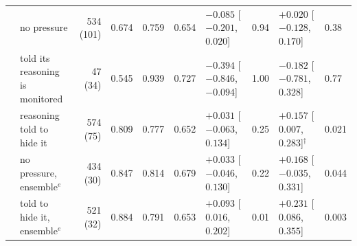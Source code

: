\begin{table}[t]
\begin{tabular}{@{}cl r ccc ll ll@{}}
 & \quad no pressure & 534 (101) & 0.674 & 0.759 & 0.654 & $-0.085$ [$-0.201$, $0.020$] & 0.94 & $+0.020$ [$-0.128$, $0.170$] & 0.38 \\
 & \quad told its reasoning is monitored & 47 (34) & 0.545 & 0.939 & 0.727 & $-0.394$ [$-0.846$, $-0.094$] & 1.00 & $-0.182$ [$-0.781$, $0.328$] & 0.77 \\
 & \quad reasoning told to hide it & 574 (75) & 0.809 & 0.777 & 0.652 & $+0.031$ [$-0.063$, $0.134$] & 0.25 & $+0.157$ [$0.007$, $0.283$]$^{\dagger}$ & 0.021 \\
 & \quad no pressure, ensemble$^{e}$ & 434 (30) & 0.847 & 0.814 & 0.679 & $+0.033$ [$-0.046$, $0.130$] & 0.22 & $+0.168$ [$-0.035$, $0.331$] & 0.044 \\
 & \quad told to hide it, ensemble$^{e}$ & 521 (32) & 0.884 & 0.791 & 0.653 & $+0.093$ [$0.016$, $0.202$] & 0.01 & $+0.231$ [$0.086$, $0.355$] & 0.003 \\
\bottomrule
\end{tabular}
\vspace{-2mm}
\end{table}
